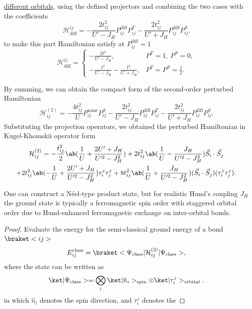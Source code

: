 \begin{solution}
\begin{enumext}[label = \Roman*.]
\begin{enumext}
      \underline{different orbitals}, using the defined projectors and
      combining the two cases with the coefficients
      \[
        \mathcal H_\text{diff}^{ij}
      = -\frac{2t_{ij}^2}{U' - J_H} P_{ij}^\text{diff} P_{ij}^T
        -\frac{2t_{ij}^2}{U' + J_H} P_{ij}^\text{diff} P_{ij}^S.
      \]
      to make this part Hamiltonian satisfy
      at $P_{ij}^\text{diff} = 1$
      \[
        \mathcal H_\text{diff}^{ij} =
        \begin{cases}
          -\frac{2t^2}{U' - J_H}, & P^T = 1,\ P^S = 0,\\
          -\frac{t^2}{U' - J_H} - \frac{t^2}{U' + J_H}, & P^T = P^S = \frac12.
        \end{cases}
      \]
    \end{enumext}
    By summing, we can obtain the compact form of the second-order perturbed
    Hamiltonian
    \[
      \mathcal H_{ij}^{(2)} = -\frac{4t_{ij}^2}{U} P_{ij}^\text{same} P_{ij}^S
    - \frac{2t_{ij}^2}{U' - J_H} P_{ij}^\text{diff} P_{ij}^T
    - \frac{2t_{ij}^2}{U' + J_H} P_{ij}^\text{diff} P_{ij}^S.
    \]
    Substituting the projection operators, we obtained the perturbed
    Hamiltonian in Kugel-Khomskii operator form
    \begin{multline}
      \mathcal H_{ij}^{(2)}
    = -\frac{t_{ij}^2}2 \ab(\frac 1U + \frac{2U' + J_H}{U'^2 - J_H^2})
    + 2t_{ij}^2\ab(\frac1U - \frac{J_H}{U'^2 - J_H^2}) \vec S_i \cdot \vec S_j\\
    + 2t_{ij}^2\ab(-\frac1U + \frac{2U' + J_H}{U'^2 - J_H^2}) \tau_i^z \tau_j^z
    + 8t_{ij}^2\ab(\frac1U + \frac{J_H}{U'^2 - J_H^2})
      (\vec S_i \cdot \vec S_j) (\tau_i^z \tau_j^z).
    \label{eq:2nd_ptb_h}
    \end{multline}
    \item One can construct a N\'eel-type product state, but for realistic
    Hund's coupling $J_H$ the ground state is typically a ferromagnetic spin
    order with staggered orbital order due to Hund-enhanced ferromagnetic
    exchange on inter-orbital bonds.
    \begin{proof}
      Evaluate the energy for the semi-classical ground energy of a
      bond $\braket<ij>$
      \[
        E_{ij}^\text{class}
      = \braket<\Psi_\text{class}|\mathcal H_{ij}^{(2)}|\Psi_\text{class}>,
      \]
      where the state can be written as
      \[
        \ket|\Psi_\text{class}> = \bigotimes_i
        \ket|\hat n_i>_\text{spin} \otimes \ket|\tau_i^z>_\text{orbital}.
      \]
      in which $\hat n_i$ denotes the spin direction, and $\tau_i^z$ denotes the

\end{proof}
\end{enumext}
\end{solution}

